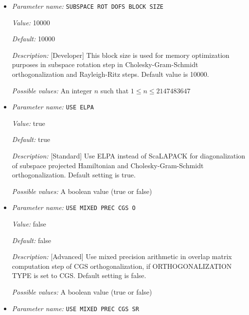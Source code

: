 \begin{itemize}
{\it Possible values:} A boolean value (true or false)
\item {\it Parameter name:} {\tt SUBSPACE ROT DOFS BLOCK SIZE}
\label{parameters:SCF parameters/Eigen_2dsolver parameters/SUBSPACE ROT DOFS BLOCK SIZE}
\label{parameters:SCF_20parameters/Eigen_2dsolver_20parameters/SUBSPACE_20ROT_20DOFS_20BLOCK_20SIZE}


{\it Value:} 10000


{\it Default:} 10000


{\it Description:} [Developer] This block size is used for memory optimization purposes in subspace rotation step in Cholesky-Gram-Schmidt orthogonalization and Rayleigh-Ritz steps. Default value is 10000.


{\it Possible values:} An integer $n$ such that $1\leq n \leq 2147483647$
\item {\it Parameter name:} {\tt USE ELPA}
\label{parameters:SCF parameters/Eigen_2dsolver parameters/USE ELPA}
\label{parameters:SCF_20parameters/Eigen_2dsolver_20parameters/USE_20ELPA}


{\it Value:} true


{\it Default:} true


{\it Description:} [Standard] Use ELPA instead of ScaLAPACK for diagonalization of subspace projected Hamiltonian and Cholesky-Gram-Schmidt orthogonalization.  Default setting is true.


{\it Possible values:} A boolean value (true or false)
\item {\it Parameter name:} {\tt USE MIXED PREC CGS O}
\label{parameters:SCF parameters/Eigen_2dsolver parameters/USE MIXED PREC CGS O}
\label{parameters:SCF_20parameters/Eigen_2dsolver_20parameters/USE_20MIXED_20PREC_20CGS_20O}


{\it Value:} false


{\it Default:} false


{\it Description:} [Advanced] Use mixed precision arithmetic in overlap matrix computation step of CGS orthogonalization, if ORTHOGONALIZATION TYPE is set to CGS. Default setting is false.


{\it Possible values:} A boolean value (true or false)
\item {\it Parameter name:} {\tt USE MIXED PREC CGS SR}
\label{parameters:SCF parameters/Eigen_2dsolver parameters/USE MIXED PREC CGS SR}
\label{parameters:SCF_20parameters/Eigen_2dsolver_20parameters/USE_20MIXED_20PREC_20CGS_20SR}



\end{itemize}
